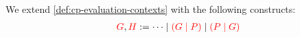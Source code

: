 \begin{definition}\label{def:nc-evaluation-contexts}
  We extend \cref{def:cp-evaluation-contexts} with the following constructs:
  \begin{align*}
    \textcolor{red}{G}, \textcolor{red}{H} := \dots \mid \textcolor{red}{(G \mid P)} \mid \textcolor{red}{(P \mid G)}
  \end{align*}
\end{definition}
